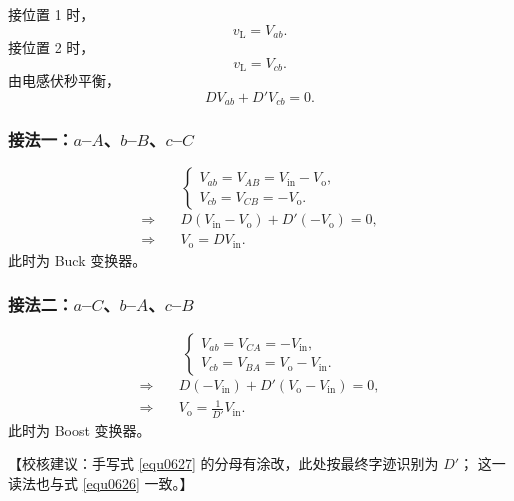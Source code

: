 \documentclass[
  12pt,
  UTF8,
  a4paper,
  fontset=fandol,
  oneside,
  openany
]{ctexrep}
\newcommand{\reviewnote}[1]{%
  \par\smallskip
  {\color{reviewgray}\small\noindent【校核建议：#1】\par}
  \smallskip
}
\begin{document}
接位置 1 时，
\begin{equation}
  v_{\mathrm{L}}=V_{ab}.
  \label{equ0619}
\end{equation}
接位置 2 时，
\begin{equation}
  v_{\mathrm{L}}=V_{cb}.
  \label{equ0620}
\end{equation}
由电感伏秒平衡，
\begin{equation}
  DV_{ab}+D'V_{cb}=0.
  \label{equ0621}
\end{equation}

\subsubsection{接法一：$a$--$A$、$b$--$B$、$c$--$C$}

\begin{equation}
  \begin{cases}
    V_{ab}=V_{AB}=V_{\mathrm{in}}-V_{\mathrm{o}}, \\
    V_{cb}=V_{CB}=-V_{\mathrm{o}}.
  \end{cases}
  \label{equ0622}
\end{equation}
\begin{align}
  \Rightarrow\quad & D(V_{\mathrm{in}}-V_{\mathrm{o}})+D'(-V_{\mathrm{o}})=0,
  \label{equ0623}                                                             \\
  \Rightarrow\quad & V_{\mathrm{o}}=DV_{\mathrm{in}}.\label{equ0624}
\end{align}
此时为 Buck 变换器。

\subsubsection{接法二：$a$--$C$、$b$--$A$、$c$--$B$}

\begin{equation}
  \begin{cases}
    V_{ab}=V_{CA}=-V_{\mathrm{in}}, \\
    V_{cb}=V_{BA}=V_{\mathrm{o}}-V_{\mathrm{in}}.
  \end{cases}
  \label{equ0625}
\end{equation}
\begin{align}
  \Rightarrow\quad & D(-V_{\mathrm{in}})+D'(V_{\mathrm{o}}-V_{\mathrm{in}})=0,
  \label{equ0626}                                                               \\
  \Rightarrow\quad & V_{\mathrm{o}}=\frac{1}{D'}V_{\mathrm{in}}.\label{equ0627}
\end{align}
此时为 Boost 变换器。
\reviewnote{手写式 \eqref{equ0627} 的分母有涂改，此处按最终字迹识别为 $D'$；
  这一读法也与式 \eqref{equ0626} 一致。}
\end{document}
